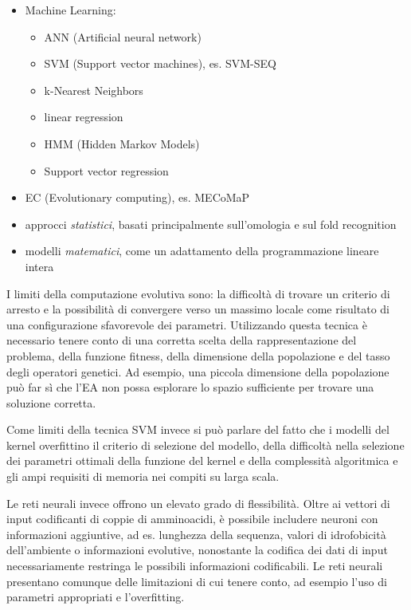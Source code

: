 \begin{itemize}
	\item Machine Learning:
	\begin{itemize}
		\item ANN (Artificial neural network)
		\item SVM (Support vector machines), es. SVM-SEQ 
		\item k-Nearest Neighbors
		\item linear regression
		\item HMM (Hidden Markov Models)
		\item Support vector regression
	\end{itemize}
	
	\item EC (Evolutionary computing), es. MECoMaP
	\item approcci \textit{statistici}, basati principalmente sull'omologia e sul fold recognition
	\item modelli \textit{matematici}, come un adattamento della programmazione lineare intera
\end{itemize}

I limiti della computazione evolutiva sono: la difficoltà di trovare un criterio di arresto e la possibilità di convergere verso un massimo locale come risultato di una configurazione sfavorevole dei parametri. Utilizzando questa tecnica è necessario tenere conto di una corretta scelta della rappresentazione del problema, della funzione fitness, della dimensione della popolazione e del tasso degli operatori genetici. Ad esempio, una piccola dimensione della popolazione può far sì che l'EA non possa esplorare lo spazio sufficiente per trovare una soluzione corretta.

\par Come limiti della tecnica SVM invece si può parlare del fatto che i modelli del kernel overfittino il criterio di selezione del modello, della difficoltà nella selezione dei parametri ottimali della funzione del kernel e della complessità algoritmica e gli ampi requisiti di memoria nei compiti su larga scala.

\par Le reti neurali invece offrono un elevato grado di flessibilità. Oltre ai vettori di input codificanti di coppie di amminoacidi, è possibile includere neuroni con informazioni aggiuntive, ad es. lunghezza della sequenza, valori di idrofobicità dell'ambiente o informazioni evolutive, nonostante la codifica dei dati di input necessariamente restringa le possibili informazioni codificabili. Le reti neurali presentano comunque delle limitazioni di cui tenere conto, ad esempio l'uso di parametri appropriati e l'overfitting.

